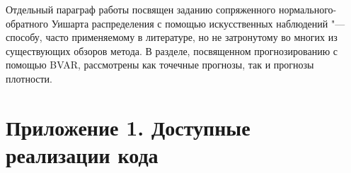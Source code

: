 \documentclass[11pt]{article} %
\begin{document}
Отдельный параграф работы посвящен заданию сопряженного нормального-обратного Уишарта распределения с помощью искусственных наблюдений "--- способу, часто применяемому в литературе, но не затронутому во многих из существующих обзоров метода. В разделе, посвященном прогнозированию с помощью BVAR, рассмотрены как точечные прогнозы, так и прогнозы плотности.


\newpage
\printbibliography

\newpage


\section*{Приложение 1. Доступные реализации кода}
\end{document}
